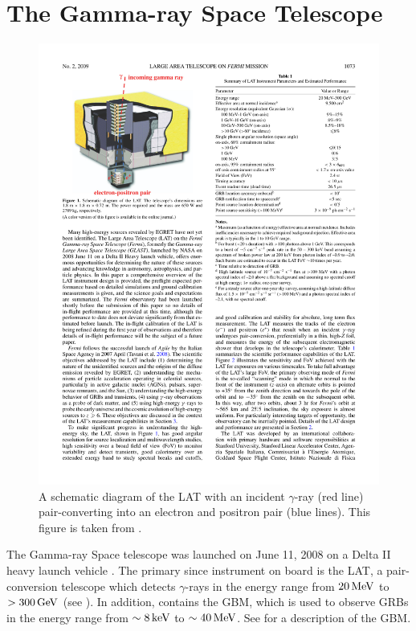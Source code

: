 \section{The \fermi Gamma-ray Space Telescope}

\begin{figure}[htbp]
  \centering
  \includegraphics{chapters/introduction/figures/lat_detector_cutout.pdf}
  \caption{A schematic diagram of the \ac{LAT} with an incident
  $\gamma$-ray (red line) pair-converting into an electron
  and positron pair (blue lines).  This figure is taken from
  \citep{atwood_2009a_large-telescope}.}
\end{figure} 

The \fermi Gamma-ray Space telescope was launched on June 11, 2008 on
a Delta II heavy launch vehicle \citep{atwood_2009a_large-telescope}.
The primary since instrument on board \fermi is the \ac{LAT},
a pair-conversion telescope which detects $\gamma$-rays
in the energy range from $20\,\text{MeV}$ to $>300\,\text{GeV}$
(see ).
In addition, \fermi contains the \Ac{GBM}, which is used to observe
\acp{GRB} in the energy range from $\sim8\,\text{keV}$ to $\sim40\,\text{MeV}$.
See \cite{meegan_2009a_fermi-gamma-ray} for a description of the \ac{GBM}.

